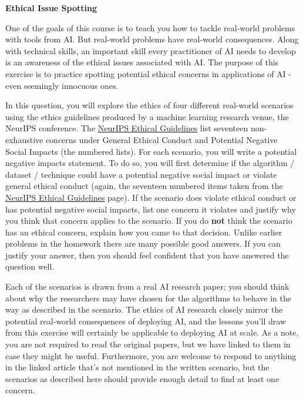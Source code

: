 \item {\bf Ethical Issue Spotting}

One of the goals of this course is to teach you how to tackle real-world problems with tools from AI. But real-world problems have real-world consequences. Along with technical skills, an important skill every practitioner of AI needs to develop is an awareness of the ethical issues associated with AI. The purpose of this exercise is to practice spotting potential ethical concerns in applications of AI - even seemingly innocuous ones.

In this question, you will explore the ethics of four different real-world scenarios using the ethics guidelines produced by a machine learning research venue, the NeurIPS conference. The \href{https://nips.cc/Conferences/2023/EthicsGuidelinesForReviewers}{NeurIPS Ethical Guidelines} list seventeen non-exhaustive concerns under General Ethical Conduct and Potential Negative Social Impacts (the numbered lists). For each scenario, you will write a potential negative impacts statement. To do so, you will first determine if the algorithm / dataset / technique could have a potential negative social impact or violate general ethical conduct (again, the seventeen numbered items taken from the \href{https://nips.cc/Conferences/2023/EthicsGuidelinesForReviewers}{NeurIPS Ethical Guidelines} page). If the scenario does violate ethical conduct or has potential negative social impacts, list one concern it violates and justify why you think that concern applies to the scenario. If you do \textbf{not} think the scenario has an ethical concern, explain how you came to that decision. Unlike earlier problems in the homework there are many possible good answers. If you can justify your answer, then you should feel confident that you have answered the question well.

Each of the scenarios is drawn from a real AI research paper; you should think about why the researchers may have chosen for the algorithms to behave in the way as described in the scenario. The ethics of AI research closely mirror the potential real-world consequences of deploying AI, and the lessons you'll draw from this exercise will certainly be applicable to deploying AI at scale. As a note, you are not required to read the original papers, but we have linked to them in case they might be useful. Furthermore, you are welcome to respond to anything in the linked article that's not mentioned in the written scenario, but the scenarios as described here should provide enough detail to find at least one concern.

